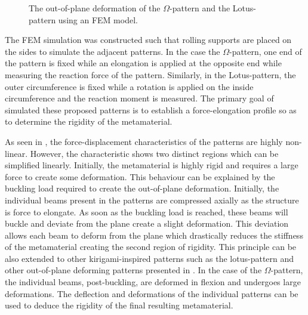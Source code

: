 \begin{figure}[hbt!]
    \centering
    \resizebox{0.48\textwidth}{!}{}
    \resizebox{0.48\textwidth}{!}{}
    \caption{The out-of-plane deformation of the $\Omega$-pattern and the Lotus-pattern using an FEM model.}
    \label{fig:kirigami-patterns-deformed}
\end{figure}

The FEM simulation was constructed such that rolling supports are placed on the sides to simulate the adjacent patterns. In the case the $\Omega$-pattern, one end of the pattern is fixed while an elongation is applied at the opposite end while measuring the reaction force of the pattern. Similarly, in the Lotus-pattern, the outer circumference is fixed while a rotation is applied on the inside circumference and the reaction moment is measured. The primary goal of simulated these proposed patterns is to establish a force-elongation profile so as to determine the rigidity of the metamaterial.


As seen in \todocite, the force-displacement characteristics of the patterns are highly non-linear. However, the characteristic shows two distinct regions which can be simplified linearly. Initially, the metamaterial is highly rigid and requires a large force to create some deformation. This behaviour can be explained by the buckling load required to create the out-of-plane deformation. Initially, the individual beams present in the patterns are compressed axially as the structure is force to elongate. As soon as the buckling load is reached, these beams will buckle and deviate from the plane create a slight deformation. This deviation allows each beam to deform from the plane which drastically reduces the stiffness of the metamaterial creating the second region of rigidity. This principle can be also extended to other kirigami-inspired patterns such as the lotus-pattern and other out-of-plane deforming patterns presented in \cite{shyuKirigamiApproachEngineering2015}. In the case of the $\Omega$-pattern, the individual beams, post-buckling, are deformed in flexion and undergoes large deformations. The deflection and deformations of the individual patterns can be used to deduce the rigidity of the final resulting metamaterial.

